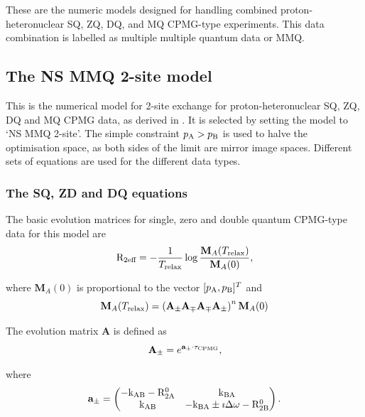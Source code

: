 These are the numeric models designed for handling combined proton-heteronuclear SQ, ZQ, DQ, and MQ CPMG-type experiments.
This data combination is labelled as multiple multiple quantum data or MMQ.



\subsection{The NS MMQ 2-site model}
\label{sect: dispersion: NS MMQ 2-site model}

This is the numerical model for 2-site exchange for proton-heteronuclear SQ, ZQ, DQ and MQ CPMG data, as derived in \citep{Korzhnev04a,Korzhnev04b,Korzhnev05b}.
It is selected by setting the model to `NS MMQ 2-site'.
The simple constraint $p_{\textrm{A}} > p_{\textrm{B}}$ is used to halve the optimisation space, as both sides of the limit are mirror image spaces.
Different sets of equations are used for the different data types.


\subsubsection{The SQ, ZD and DQ equations}

The basic evolution matrices for single, zero and double quantum CPMG-type data for this model are
\begin{equation}
    \mathrm{R}_{\textrm{2eff}} = - \frac{1}{T_{\textrm{relax}}} \log \frac{\mathbf{M}_A(T_{\textrm{relax}})}{\mathbf{M}_A(0)},
\end{equation}

where $\mathbf{M}_A(0)$ is proportional to the vector $[p_{\textrm{A}}, p_{\textrm{B}}]^T$ and
\begin{equation}
    \mathbf{M}_A(T_{\textrm{relax}}) = \left( \mathbf{A_{\pm}}\mathbf{A_\mp}\mathbf{A_\mp}\mathbf{A_{\pm}} \right)^n \mathbf{M}_A(0)
\end{equation}

The evolution matrix $\mathbf{A}$ is defined as
\begin{equation}
    \mathbf{A_{\pm}} = e^{\mathbf{a_{\pm}} \cdot \tau_{\textrm{CPMG}}},
\end{equation}

where
\begin{equation}
    \mathbf{a_{\pm}} = \begin{pmatrix}
                       -\textrm{k}_{\textrm{AB}} -\mathrm{R}_{\mathrm{2A}}^0 & \textrm{k}_{\textrm{BA}} \\
                       \textrm{k}_{\textrm{AB}}  & -\textrm{k}_{\textrm{BA}} \pm\imath\Delta\omega - \mathrm{R}_{\mathrm{2B}}^0
                     \end{pmatrix}.
\end{equation}

